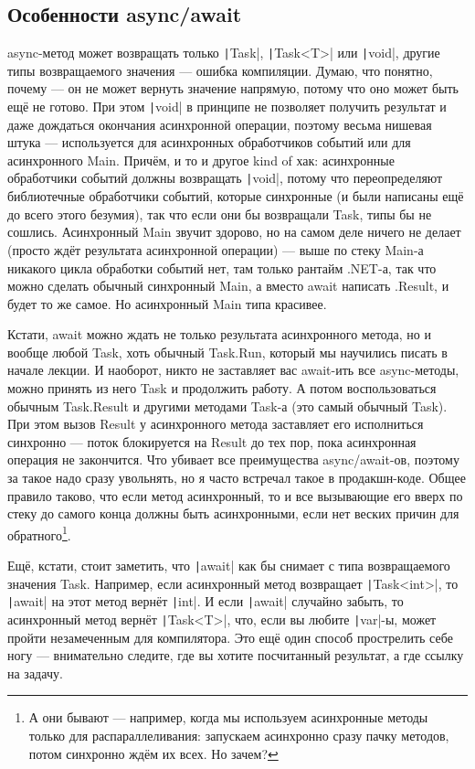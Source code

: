 \documentclass{../../text-style}
\begin{document}
\subsection{Особенности async/await}

async-метод может возвращать только \texttt|Task|, \texttt|Task<T>| или \texttt|void|, другие типы возвращаемого значения --- ошибка компиляции. Думаю, что понятно, почему --- он не может вернуть значение напрямую, потому что оно может быть ещё не готово. При этом \texttt|void| в принципе не позволяет получить результат и даже дождаться окончания асинхронной операции, поэтому весьма нишевая штука --- используется для асинхронных обработчиков событий или для асинхронного Main. Причём, и то и другое kind of хак: асинхронные обработчики событий должны возвращать \texttt|void|, потому что переопределяют библиотечные обработчики событий, которые синхронные (и были написаны ещё до всего этого безумия), так что если они бы возвращали Task, типы бы не сошлись. Асинхронный Main звучит здорово, но на самом деле ничего не делает (просто ждёт результата асинхронной операции) --- выше по стеку Main-а никакого цикла обработки событий нет, там только рантайм .NET-а, так что можно сделать обычный синхронный Main, а вместо await написать .Result, и будет то же самое. Но асинхронный Main типа красивее.

Кстати, await можно ждать не только результата асинхронного метода, но и вообще любой Task, хоть обычный Task.Run, который мы научились писать в начале лекции. И наоборот, никто не заставляет вас await-ить все async-методы, можно принять из него Task и продолжить работу. А потом воспользоваться обычным Task.Result и другими методами Task-а (это самый обычный Task). При этом вызов Result у асинхронного метода заставляет его исполниться синхронно --- поток блокируется на Result до тех пор, пока асинхронная операция не закончится. Что убивает все преимущества async/await-ов, поэтому за такое надо сразу увольнять, но я часто встречал такое в продакшн-коде. Общее правило таково, что если метод асинхронный, то и все вызывающие его вверх по стеку до самого конца должны быть асинхронными, если нет веских причин для обратного\footnote{А они бывают --- например, когда мы используем асинхронные методы только для распараллеливания: запускаем асинхронно сразу пачку методов, потом синхронно ждём их всех. Но зачем?}.

Ещё, кстати, стоит заметить, что \texttt|await| как бы снимает с типа возвращаемого значения Task. Например, если асинхронный метод возвращает \texttt|Task<int>|, то \texttt|await| на этот метод вернёт \texttt|int|. И если \texttt|await| случайно забыть, то асинхронный метод вернёт \texttt|Task<T>|, что, если вы любите \texttt|var|-ы, может пройти незамеченным для компилятора. Это ещё один способ прострелить себе ногу --- внимательно следите, где вы хотите посчитанный результат, а где ссылку на задачу.
\end{document}
